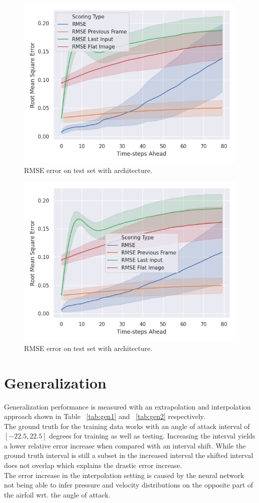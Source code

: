 \documentclass[acmtog]{techreportacmart}
\begin{document}
\begin{figure}[h]
  \includegraphics[width=.35\textwidth]{figures/transfer/DFP_Test_RMSE_Quality_start_15}
  \caption{RMSE error on test set with \cite{Thuerey20} architecture.}
  \label{fig:T1}
\end{figure}

\begin{figure}[h]
  \includegraphics[width=.35\textwidth]{figures/transfer/Transfer_Test_RMSE_Quality_start_15}
  \caption{RMSE error on test set with \cite{Fotiadis2020} architecture.}
  \label{fig:T2}
\end{figure}

\section{Generalization}
Generalization performance is measured with an extrapolation and interpolation approach shown 
in Table ~\ref{tab:gen1} and ~\ref{tab:gen2} respectively. \\
The ground truth for the training data works with an angle of attack interval of $[-22.5, 22.5]$ degrees
for training as well as testing. Increasing the interval yields a lower relative error increase when compared
with an interval shift. While the ground truth interval is still a subset in the increased interval the 
shifted interval does not overlap which explains the drastic error increase.\\
The error increase in the interpolation setting is caused by the neural network 
not being able to infer pressure and velocity distributions on the opposite part of the airfoil wrt.
the angle of attack.
\end{document}
